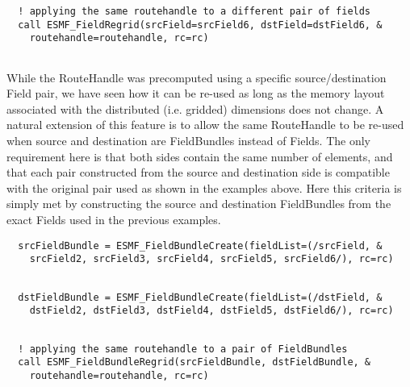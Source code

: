 
 \begin{verbatim}
  ! applying the same routehandle to a different pair of fields
  call ESMF_FieldRegrid(srcField=srcField6, dstField=dstField6, &
    routehandle=routehandle, rc=rc)
 
\end{verbatim}
 

   While the RouteHandle was precomputed using a specific source/destination
   Field pair, we have seen how it can be re-used as long as the memory layout 
   associated with the distributed (i.e. gridded) dimensions does not change.
   A natural extension of this feature is to allow the same RouteHandle to be 
   re-used when source and destination are FieldBundles instead of Fields. The
   only requirement here is that both sides contain the same number of elements,
   and that
   each pair constructed from the source and destination side is compatible with
   the original pair used as shown in the examples above. Here this criteria is
   simply met by constructing the source and destination FieldBundles from the
   exact Fields used in the previous examples. 

 \begin{verbatim}
  srcFieldBundle = ESMF_FieldBundleCreate(fieldList=(/srcField, &
    srcField2, srcField3, srcField4, srcField5, srcField6/), rc=rc)
 
\end{verbatim}
 

 \begin{verbatim}
  dstFieldBundle = ESMF_FieldBundleCreate(fieldList=(/dstField, &
    dstField2, dstField3, dstField4, dstField5, dstField6/), rc=rc)
 
\end{verbatim}
 

 \begin{verbatim}
  ! applying the same routehandle to a pair of FieldBundles
  call ESMF_FieldBundleRegrid(srcFieldBundle, dstFieldBundle, &
    routehandle=routehandle, rc=rc)
 
\end{verbatim}
 

